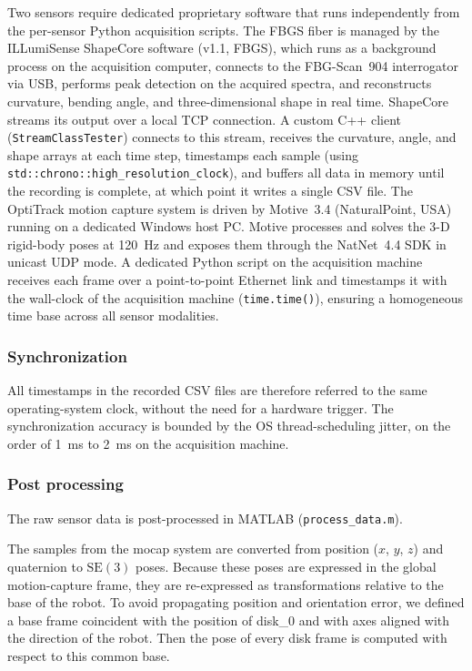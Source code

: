 \documentclass[14pt, a4paper]{article}
\begin{document}
Two sensors require dedicated proprietary software that runs independently from the
per-sensor Python acquisition scripts.
The FBGS fiber is managed by the ILLumiSense ShapeCore software (v1.1, FBGS),
which runs as a background process on the acquisition computer, connects to the
FBG-Scan~904 interrogator via USB, performs peak detection on the acquired spectra,
and reconstructs curvature, bending angle, and three-dimensional shape in real time.
ShapeCore streams its output over a local TCP connection.
A custom C++ client (\texttt{StreamClassTester}) connects to this stream,
receives the curvature, angle, and shape arrays at each time step,
timestamps each sample (using \texttt{std::chrono::high\_resolution\_clock}), and buffers all data in memory
until the recording is complete, at which point it writes a single CSV file.
%
The OptiTrack motion capture system is driven by Motive~3.4 (NaturalPoint, USA)
running on a dedicated Windows host PC.
Motive processes and solves the 3-D rigid-body poses at \SI{120}{\hertz} and
exposes them through the NatNet~4.4 SDK in unicast UDP mode.
A dedicated Python script on the acquisition machine receives each frame over a
point-to-point Ethernet link and timestamps it with the wall-clock of the
acquisition machine (\texttt{time.time()}), ensuring a homogeneous time base
across all sensor modalities.

\subsubsection{Synchronization}
All timestamps in the recorded CSV files are therefore referred to the same operating-system clock, without the need for a hardware trigger.
The synchronization accuracy is bounded by the OS thread-scheduling jitter, on the order of \SI{1}{\milli\second} to \SI{2}{\milli\second} on the acquisition machine.


\subsubsection{Post processing}
The raw sensor data is post-processed in MATLAB (\texttt{process\_data.m}).

The samples from the mocap system are converted from position ($x$, $y$, $z$) and quaternion to $\mathrm{SE}(3)$ poses.
Because these poses are expressed in the global motion-capture frame, they are re-expressed as transformations relative to the base of the robot.
To avoid propagating position and orientation error, we defined a base frame coincident with the position of disk\_0 and with axes aligned with the direction of the robot.
Then the pose of every disk frame is computed with respect to this common base.
\end{document}
